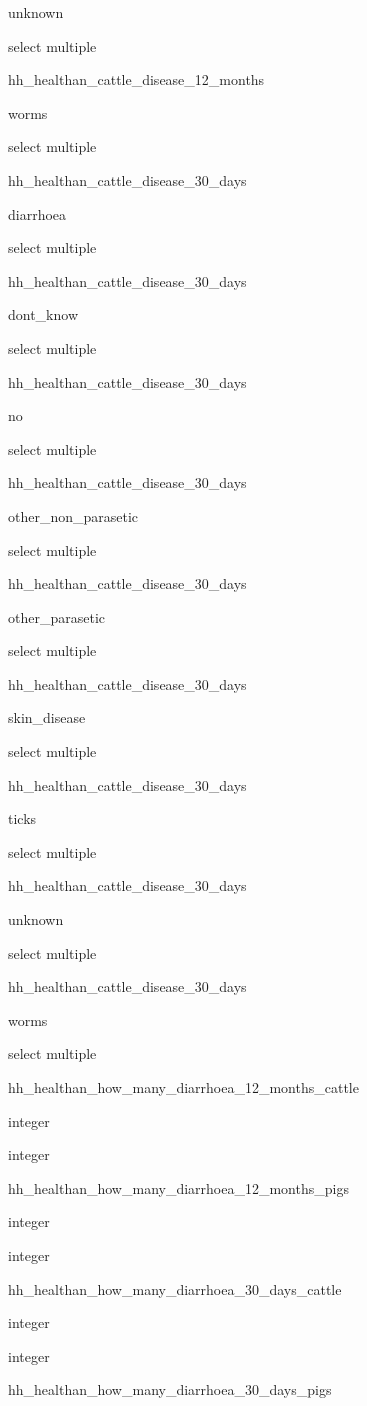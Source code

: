 \documentclass[]{article}
\begin{document}
unknown

select multiple

hh\_healthan\_cattle\_disease\_12\_months

worms

select multiple

hh\_healthan\_cattle\_disease\_30\_days

diarrhoea

select multiple

hh\_healthan\_cattle\_disease\_30\_days

dont\_know

select multiple

hh\_healthan\_cattle\_disease\_30\_days

no

select multiple

hh\_healthan\_cattle\_disease\_30\_days

other\_non\_parasetic

select multiple

hh\_healthan\_cattle\_disease\_30\_days

other\_parasetic

select multiple

hh\_healthan\_cattle\_disease\_30\_days

skin\_disease

select multiple

hh\_healthan\_cattle\_disease\_30\_days

ticks

select multiple

hh\_healthan\_cattle\_disease\_30\_days

unknown

select multiple

hh\_healthan\_cattle\_disease\_30\_days

worms

select multiple

hh\_healthan\_how\_many\_diarrhoea\_12\_months\_cattle

integer

integer

hh\_healthan\_how\_many\_diarrhoea\_12\_months\_pigs

integer

integer

hh\_healthan\_how\_many\_diarrhoea\_30\_days\_cattle

integer

integer

hh\_healthan\_how\_many\_diarrhoea\_30\_days\_pigs
\end{document}
